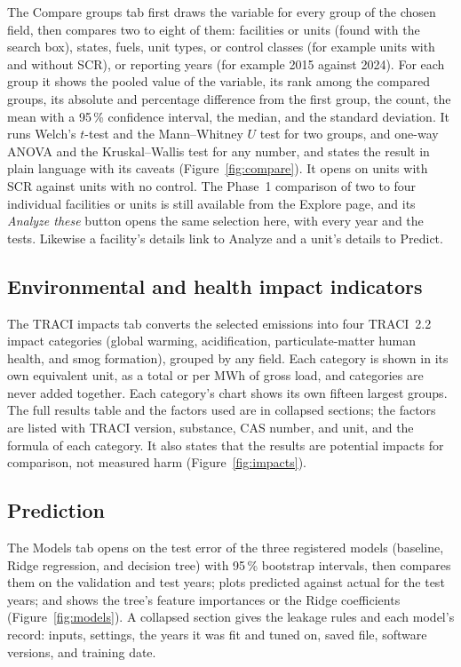 \documentclass[11pt,a4paper]{article}
\begin{document}
The Compare groups tab first draws the variable for every group of the chosen field, then
compares two to eight of them: facilities or units (found with the search box), states, fuels,
unit types, \NOx{} or \SOtwo{} control classes (for example units with and without SCR), or reporting
years (for example 2015 against 2024). For each group it shows the pooled value of the variable,
its rank among the compared groups, its absolute and percentage difference from the first
group, the count, the mean with a 95\,\% confidence interval, the median, and the standard
deviation. It runs Welch's $t$-test and the Mann--Whitney $U$ test for two groups, and one-way
ANOVA and the Kruskal--Wallis test for any number, and states the result in plain language with
its caveats (Figure~\ref{fig:compare}). It opens on units with SCR against units with no \NOx{}
control. The Phase~1 comparison of two to four individual facilities or units is still
available from the Explore page, and its \emph{Analyze these} button opens the same selection
here, with every year and the tests. Likewise a facility's details link to Analyze and a unit's
details to Predict.

\subsection{Environmental and health impact indicators}

The TRACI impacts tab converts the selected emissions into four TRACI~2.2 impact categories (global
warming, acidification, particulate-matter human health, and smog formation), grouped by any
field. Each category is shown in its own equivalent unit, as a total or per MWh of gross load,
and categories are never added together. Each category's chart shows its own fifteen largest
groups. The full results table and the factors used are in collapsed sections; the factors are
listed with TRACI version,
substance, CAS number, and unit, and the formula of each category. It also states that the
results are potential impacts for comparison, not measured harm (Figure~\ref{fig:impacts}).

\subsection{Prediction}

The Models tab opens on the test error of the three registered models (baseline, Ridge
regression, and decision tree) with 95\,\% bootstrap intervals, then compares them on the
validation and test years; plots
predicted against actual \NOx{} for the test years; and shows the tree's feature importances or
the Ridge coefficients (Figure~\ref{fig:models}). A collapsed section gives the leakage rules
and each model's record: inputs, settings, the years it was fit and tuned on, saved file,
software versions, and training date.
\end{document}
